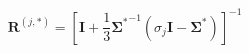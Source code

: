 \begin{equation}
    \mathbf{R}^{(j,*)} = \left[\mathbf{I}+\frac{1}{3}\boldsymbol{\Sigma^*}^{-1}(\sigma_j\mathbf{I}-\boldsymbol{\Sigma^*})\right]^{-1}
\label{eq:emt_r_spheres}
\end{equation}
